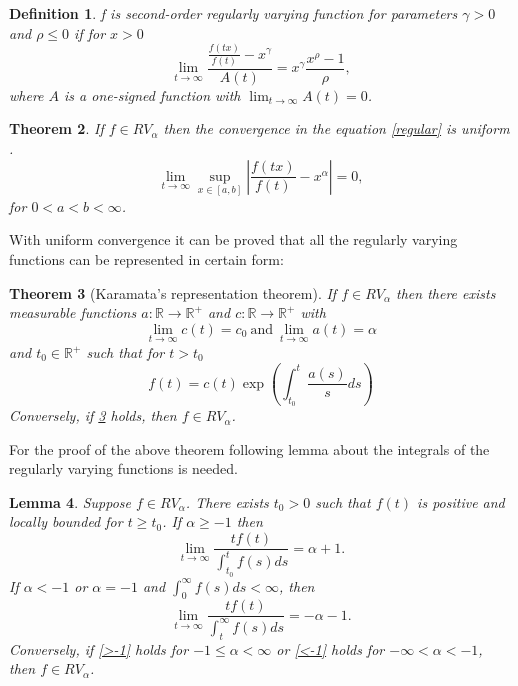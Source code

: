 \documentclass[english,12pt,a4paper,pdftex,sci,utf8]{aaltothesis} %
\newtheorem{theorem}{Theorem}[section]
\newtheorem{lemma}[theorem]{Lemma}
\newtheorem{definition}[theorem]{Definition}
\begin{document}
\begin{definition}
f is second-order regularly varying function for parameters $\gamma>0$ and $\rho \leq 0$ if for $x>0$
\begin{equation*}
\lim_{t \rightarrow \infty} \frac{\frac{f(tx)}{f(t)}-x^{\gamma}}{A(t)} = x^{\gamma} \frac{x^{\rho}-1}{\rho},
\end{equation*}
where $A$ is a one-signed function with $\lim_{t \rightarrow \infty} A(t)=0$.
\label{2RV}
\end{definition}


\begin{theorem}
If $f \in RV_{\alpha}$ then the convergence in the equation \ref{regular} is uniform .
\begin{equation*}
\lim_{t \rightarrow \infty} \sup_{x  \in [a,b]} \left| \frac{f(tx)}{f(t)} - x^{\alpha} \right| = 0,
\end{equation*}
for $0<a<b<\infty$.
\label{uniform}
\end{theorem}



With uniform convergence it can be proved that all the regularly varying functions can be represented in certain form:

\begin{theorem}[Karamata's representation theorem]
If $f \in RV_{\alpha}$ then there exists measurable functions $a: \mathbb{R} \rightarrow \mathbb{R^+}$ and $c: \mathbb{R} \rightarrow \mathbb{R^+}$ with
\begin{equation*}
\lim_{t \rightarrow \infty} c(t) = c_0 \  \text{and} \  \lim_{t \rightarrow \infty} a(t) = \alpha
\end{equation*}
and $t_0 \in \mathbb{R^+}$ such that for $t > t_0$
\begin{equation}
f(t) = c(t) \exp \left(\int_{t_0}^{t}  \frac{a(s)}{s} ds \right)
\end{equation}
Conversely, if \ref{karamata} holds, then $f \in RV_{\alpha}$.
\label{karamata}
\end{theorem}

For the proof of the above theorem following lemma about the integrals of the regularly varying functions is needed.

\begin{lemma}
Suppose $f \in RV_{\alpha}$. There exists $t_0 > 0$ such that $f(t)$ is positive and locally bounded for $t \geq t_0$. If $\alpha \geq -1$ then
\begin{equation}
\lim_{t \rightarrow \infty} \frac{tf(t)}{\int_{t_0}^{t}f(s)ds} = \alpha + 1.
\label{>-1}
\end{equation}
If $\alpha<-1$ or $\alpha= -1$ and $\int_{0}^{\infty}f(s)ds<\infty$, then
\begin{equation}
\lim_{t \rightarrow \infty} \frac{tf(t)}{\int_{t}^{\infty} f(s) ds} = -\alpha - 1.
\label{<-1}
\end{equation}
Conversely, if \ref{>-1} holds for $-1\leq \alpha < \infty$ or \ref{<-1} holds for $-\infty<\alpha<-1$, then $f \in RV_{\alpha}$.
\label{karamlemma}
\end{lemma}
\end{document}
